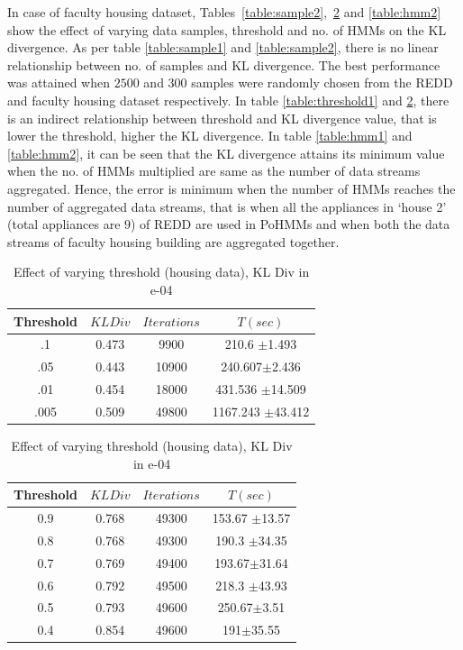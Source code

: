 \documentclass{acm_proc_article-sp}
\begin{document}
 In case of faculty housing dataset, Tables~\ref{table:sample2},~\ref{table:threshold2} and \ref{table:hmm2} show the effect of varying data samples, threshold and no. of HMMs on the KL divergence.
As per table \ref{table:sample1} and \ref{table:sample2}, there is no linear relationship between no. of samples and KL divergence. The best performance was attained when $2500$ and $300$ samples were randomly chosen from the REDD and faculty housing dataset respectively. 
In table \ref{table:threshold1} and \ref{table:threshold2}, there is an indirect relationship between threshold and KL divergence value, that is lower the threshold, higher the KL divergence. 
In table \ref{table:hmm1} and \ref{table:hmm2}, it can be seen that the KL divergence attains its minimum value when the no. of HMMs multiplied are same as the number of data streams aggregated. Hence, the error is minimum when the number of HMMs reaches the number of aggregated data streams, that is when all the appliances in `house 2' (total appliances are $9$) of REDD are used in PoHMMs and when both the data streams of faculty housing building are aggregated together.

\begin{table}[htdp]
\parbox{.39\linewidth}{
\centering
\begin{tabular}{| c | c | c | c |}
\hline
Threshold & $KL Div$ & $Iterations$ & $T(sec)$  \\
\hline
.1 & 0.473 & 9900 & 210.6 $\pm$1.493 \\
.05 & 0.443 & 10900 & 240.607$\pm$2.436 \\
.01 & 0.454 & 18000 & 431.536 $\pm$14.509 \\
.005 & 0.509 & 49800 & 1167.243 $\pm$43.412 \\
\hline
\end{tabular}
\caption{Effect of varying threshold (REDD)}
\label{table:threshold1}
}
\hfill
\parbox{.65\linewidth}{
\centering
\begin{tabular}{| c | c | c | c |}
\hline
Threshold & $KL Div$ & $Iterations$& $T(sec)$ \\
\hline
0.9 & 0.768 & 49300 & 153.67 $\pm$13.57  \\
0.8 & 0.768 & 49300 & 190.3 $\pm$34.35 \\
0.7 & 0.769 & 49400 &  193.67$\pm$31.64  \\
0.6 & 0.792 & 49500 & 218.3 $\pm$43.93  \\
0.5 & 0.793 & 49600 & 250.67$\pm$3.51  \\
0.4 & 0.854 & 49600 & 191$\pm$35.55  \\
\hline
\end{tabular}
\caption{Effect of varying threshold (housing data), KL Div in e-04}
\label{table:threshold2}
}
\end{table}
\end{document}
